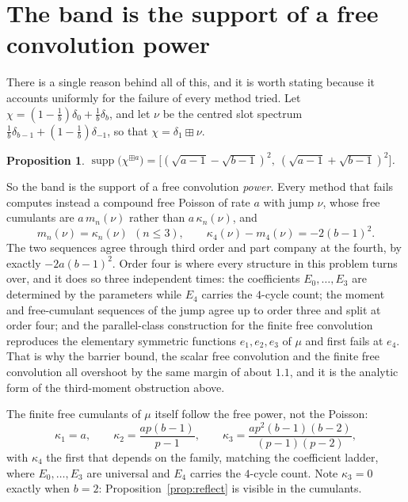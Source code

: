 \documentclass[11pt]{article}
\newtheorem{proposition}[theorem]{Proposition}
\theoremstyle{remark}
\begin{document}
\section{The band is the support of a free convolution power}

There is a single reason behind all of this, and it is worth stating because it
accounts uniformly for the failure of every method tried. Let
$\chi=(1-\tfrac1b)\delta_0+\tfrac1b\delta_b$, and let $\nu$ be the centred slot
spectrum $\tfrac1b\delta_{b-1}+(1-\tfrac1b)\delta_{-1}$, so that
$\chi=\delta_1\boxplus\nu$.

\begin{proposition}\label{prop:freepower}
$\operatorname{supp}\bigl(\chi^{\boxplus a}\bigr)
=\bigl[(\sqrt{a-1}-\sqrt{b-1})^2,\ (\sqrt{a-1}+\sqrt{b-1})^2\bigr]$.
\end{proposition}

So the band is the support of a free convolution \emph{power}. Every method that
fails computes instead a compound free Poisson of rate $a$ with jump $\nu$, whose
free cumulants are $a\,m_n(\nu)$ rather than $a\,\kappa_n(\nu)$, and
\[
m_n(\nu)=\kappa_n(\nu)\ \ (n\le3),\qquad
\kappa_4(\nu)-m_4(\nu)=-2(b-1)^2 .
\]
The two sequences agree through third order and part company at the fourth, by
exactly $-2a(b-1)^2$. Order four is where every structure in this problem turns
over, and it does so three independent times: the coefficients $E_0,\dots,E_3$ are
determined by the parameters while $E_4$ carries the $4$-cycle count; the moment and
free-cumulant sequences of the jump agree up to order three and split at order four;
and the parallel-class construction for the finite free convolution reproduces the
elementary symmetric functions $e_1,e_2,e_3$ of $\mu$ and first fails at $e_4$. That is why the barrier bound, the scalar free convolution
and the finite free convolution all overshoot by the same margin of about $1.1$,
and it is the analytic form of the third-moment obstruction above.

The finite free cumulants of $\mu$ itself follow the free power, not the Poisson:
\[
\kappa_1=a,\qquad \kappa_2=\frac{ap(b-1)}{p-1},\qquad
\kappa_3=\frac{ap^2(b-1)(b-2)}{(p-1)(p-2)},
\]
with $\kappa_4$ the first that depends on the family, matching the coefficient
ladder, where $E_0,\dots,E_3$ are universal and $E_4$ carries the $4$-cycle count.
Note $\kappa_3=0$ exactly when $b=2$: Proposition~\ref{prop:reflect} is visible in
the cumulants.
\end{document}
